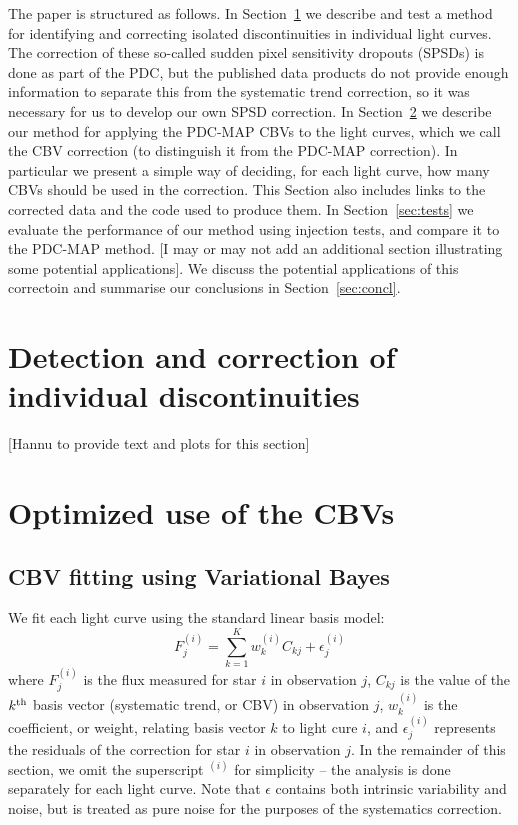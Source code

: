 \documentclass[useAMS,usenatbib]{mn2e}
\begin{document}
The paper is structured as follows. In Section~\ref{sec:jumps} we
describe and test a method for identifying and correcting isolated
discontinuities in individual light curves. The correction of these
so-called sudden pixel sensitivity dropouts (SPSDs) is done as part of
the PDC, but the published data products do not provide enough
information to separate this from the systematic trend correction, so
it was necessary for us to develop our own SPSD correction. In
Section~\ref{sec:cbv} we describe our method for applying the PDC-MAP
CBVs to the light curves, which we call the CBV correction (to
distinguish it from the PDC-MAP correction). In particular we present a simple way of
deciding, for each light curve, how many CBVs should be used in the
correction. This Section also includes links to the corrected data and
the code used to produce them. In Section~\ref{sec:tests} we evaluate the performance of
our method using injection tests, and compare it to the PDC-MAP
method. [I may or may not add an additional section illustrating some
potential applications]. We discuss the potential applications of this
correctoin and summarise our conclusions in Section~\ref{sec:concl}.

\section{Detection and correction of individual discontinuities}
\label{sec:jumps}

[Hannu to provide text and plots for this section]

\section{Optimized use of the CBVs}
\label{sec:cbv}

\subsection{CBV fitting using Variational Bayes}

We fit each light curve using the standard linear basis model:
\begin{equation}
F^{(i)}_j = \sum_{k=1}^K w^{(i)}_k C_{kj} + \epsilon^{(i)}_j
\end{equation}
where $F^{(i)}_j$ is the flux measured for star $i$ in observation
$j$, $C_{kj}$ is the value of the $k^{\rm th}$ basis vector
(systematic trend, or CBV) in observation $j$, $w^{(i)}_k$ is the
coefficient, or weight, relating basis vector $k$ to light cure $i$,
and $\epsilon^{(i)}_j$ represents the residuals of the correction for
star $i$ in observation $j$. In the remainder of this section, we omit
the superscript $^{(i)}$ for simplicity -- the analysis is done
separately for each light curve. Note that $\epsilon$ contains both
intrinsic variability and noise, but is treated as pure noise for the
purposes of the systematics correction.
\end{document}
